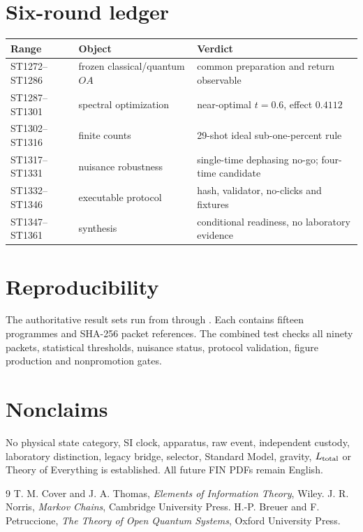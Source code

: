 \documentclass[11pt,a4paper]{article}
\begin{document}
\appendix
\section{Six-round ledger}
\begin{longtable}{@{}p{}p{}p{}@{}}
\toprule
Range & Object & Verdict \\
\midrule\endhead
ST1272--ST1286 & frozen classical/quantum $OA$ & common preparation and return observable \\
ST1287--ST1301 & spectral optimization & near-optimal $t=0.6$, effect $0.4112$ \\
ST1302--ST1316 & finite counts & 29-shot ideal sub-one-percent rule \\
ST1317--ST1331 & nuisance robustness & single-time dephasing no-go; four-time candidate \\
ST1332--ST1346 & executable protocol & hash, validator, no-clicks and fixtures \\
ST1347--ST1361 & synthesis & conditional readiness, no laboratory evidence \\
\bottomrule
\end{longtable}

\section{Reproducibility}
The authoritative result sets run from
 through
.  Each contains fifteen programmes and
SHA-256 packet references.  The combined test
 checks all ninety packets, statistical
thresholds, nuisance status, protocol validation, figure production and
nonpromotion gates.

\section{Nonclaims}
No physical state category, SI clock, apparatus, raw event, independent
custody, laboratory distinction, legacy bridge, selector, Standard Model,
gravity, $L_{\rm total}$ or Theory of Everything is established.  All future
FIN PDFs remain English.

\begin{thebibliography}{9}
 T. M. Cover and J. A. Thomas, \emph{Elements of Information Theory}, Wiley.
 J. R. Norris, \emph{Markov Chains}, Cambridge University Press.
 H.-P. Breuer and F. Petruccione, \emph{The Theory of Open Quantum Systems}, Oxford University Press.
\end{thebibliography}
\end{document}
